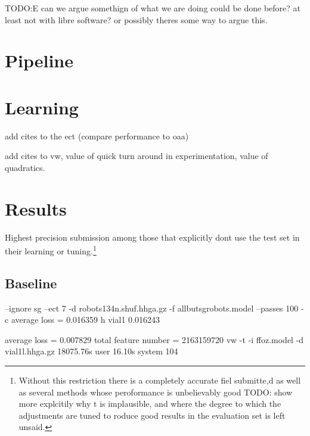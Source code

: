 \documentclass{article}
\begin{document}
TODO:E can we argue somethign of what we are doing could be done before? at least not with libre software? or possibly theres some way to argue this.





\section{Pipeline}

\section{Learning}

add cites to the ect (compare performance to oaa) 

add cites to vw, value of quick turn around in experimentation, value of quadratics.

\section{Results}

Highest precision submission among those that explicitly dont use the test set in their learning or tuning.\footnote{ Without this restriction there is a completely accurate fiel submitte,d as well as several methods whose peroformance is unbelievably good TODO: show more explcitily why t is implausible, and where the degree to which the adjustments are tuned to roduce good results in the evaluation set is left unsaid.}

\subsection{Baseline}
 
 --ignore sg --ect 7 -d robots134n.shuf.hhga.gz -f allbutsgrobots.model --passes 100 -c
 average loss = 0.016359 h                       
vial1 0.016243

average loss = 0.007829
total feature number = 2163159720
vw -t -i ffoz.model -d vial1l.hhga.gz  18075.76s user 16.10s system 104%
\end{document}
